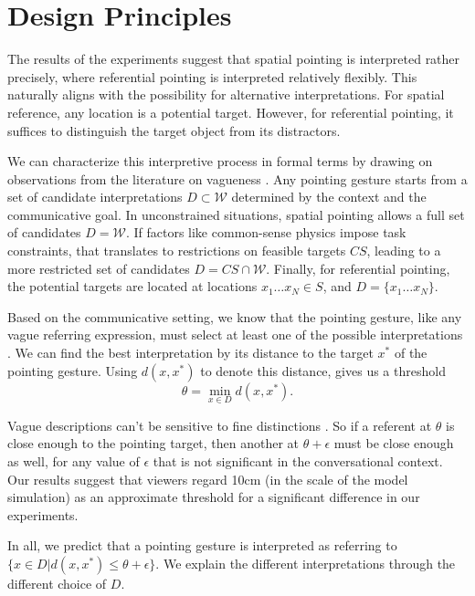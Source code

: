 \section{Design Principles}

The results of the experiments suggest that spatial pointing is interpreted rather precisely, where referential pointing is interpreted relatively flexibly.  This naturally aligns with the possibility for alternative interpretations.  For spatial reference, any location is a potential target.  However, for referential pointing, it suffices to distinguish the target object from its distractors.

We can characterize this interpretive process in formal terms by drawing on observations from the literature on vagueness \cite{kyburg2000fitting,graff2000shifting}.  Any pointing gesture starts from a set of candidate interpretations $D \subset \mathcal{W}$ determined by the context and the communicative goal.  In unconstrained situations, spatial pointing allows a full set of candidates $D = \mathcal{W}.$  If factors like common-sense physics impose task constraints, that translates to restrictions on feasible targets $CS$, leading to a more restricted set of candidates $D = CS \cap \mathcal{W}$.  Finally, for referential pointing, the potential targets are located at locations $x_1 \ldots x_N \in S$, and $D = \{ x_1 \ldots x_N \}.$

Based on the communicative setting, we know that the pointing gesture, like any vague referring expression, must select at least one of the possible interpretations \cite{kyburg2000fitting}.  We can find the best interpretation by its distance to the target $x^*$ of the pointing gesture.  Using $d(x,x^*)$ to denote this distance, gives us a threshold $$\theta = \min_{x \in D} d(x, x^*).$$

Vague descriptions can't be sensitive to fine distinctions \cite{graff2000shifting}.  So if a referent at $\theta$ is close enough to the pointing target, then another at $\theta + \epsilon$ must be close enough as well, for any value of $\epsilon$ that is not significant in the conversational context.  Our results suggest that viewers regard 10cm (in the scale of the model simulation) as an approximate threshold for a significant difference in our experiments.

In all, we predict that a pointing gesture is interpreted as referring to $\{x \in D | d(x,x^*) \leq \theta + \epsilon\}.$  We explain the different interpretations through the different choice of $D$.

